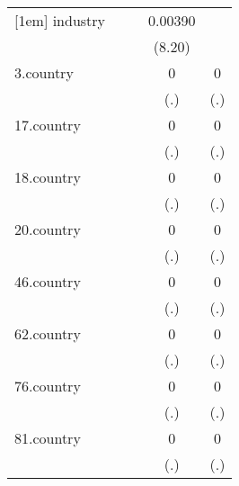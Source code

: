 {\begin{tabular}{l*{4}{c}}
[1em]
industry    &                     &                     &     0.00390\sym{***}&                     \\
            &                     &                     &      (8.20)         &                     \\
[1em]
3.country   &                     &                     &           0         &           0         \\
            &                     &                     &         (.)         &         (.)         \\
[1em]
17.country  &                     &                     &           0         &           0         \\
            &                     &                     &         (.)         &         (.)         \\
[1em]
18.country  &                     &                     &           0         &           0         \\
            &                     &                     &         (.)         &         (.)         \\
[1em]
20.country  &                     &                     &           0         &           0         \\
            &                     &                     &         (.)         &         (.)         \\
[1em]
46.country  &                     &                     &           0         &           0         \\
            &                     &                     &         (.)         &         (.)         \\
[1em]
62.country  &                     &                     &           0         &           0         \\
            &                     &                     &         (.)         &         (.)         \\
[1em]
76.country  &                     &                     &           0         &           0         \\
            &                     &                     &         (.)         &         (.)         \\
[1em]
81.country  &                     &                     &           0         &           0         \\
            &                     &                     &         (.)         &         (.)         \\

\end{tabular}}
